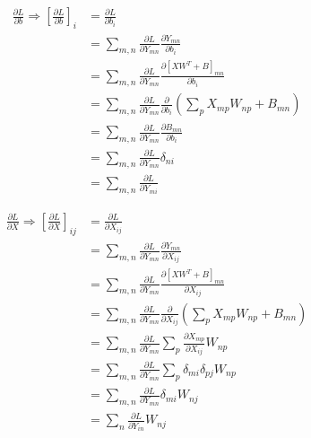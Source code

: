 \documentclass{article}
\begin{document}
\begin{align*}
  \frac{\partial L}{\partial b} \Rightarrow \left[\frac{\partial L}{\partial b}\right]_i &= \frac{\partial L}{\partial b_i} \\
                                                                                         &= \sum_{m,n}\frac{\partial L}{\partial Y_{mn}} \frac{\partial Y_{mn}}{\partial b_i} \\
                                                                                         &= \sum_{m,n}\frac{\partial L}{\partial Y_{mn}} \frac{\partial [XW^T + B]_{mn}}{\partial b_i} \\
                                                                                         &= \sum_{m,n}\frac{\partial L}{\partial Y_{mn}} \frac{\partial}{\partial b_i}\left(\sum_p X_{mp}W_{np} + B_{mn}\right) \\
                                                                                         &= \sum_{m,n}\frac{\partial L}{\partial Y_{mn}} \frac{\partial B_{mn}}{\partial b_i} \\
                                                                                         &= \sum_{m,n}\frac{\partial L}{\partial Y_{mn}} \delta_{ni} \\
&= \sum_{m,n}\frac{\partial L}{\partial Y_{mi}}
\end{align*}


\begin{align*}
  \frac{\partial L}{\partial X} \Rightarrow \left[\frac{\partial L}{\partial X}\right]_{ij} &= \frac{\partial L}{\partial X_{ij}} \\
                                                                                         &= \sum_{m,n}\frac{\partial L}{\partial Y_{mn}} \frac{\partial Y_{mn}}{\partial X_{ij}} \\
                                                                                         &= \sum_{m,n}\frac{\partial L}{\partial Y_{mn}} \frac{\partial [XW^T + B]_{mn}}{\partial X_{ij}} \\
                                                                                            &= \sum_{m,n}\frac{\partial L}{\partial Y_{mn}} \frac{\partial}{\partial X_{ij}}\left(\sum_p X_{mp}W_{np} + B_{mn}\right) \\
                                                                                            &= \sum_{m,n}\frac{\partial L}{\partial Y_{mn}} \sum_p \frac{\partial X_{mp}}{\partial X_{ij}}W_{np} \\
                                                                                            &= \sum_{m,n}\frac{\partial L}{\partial Y_{mn}} \sum_p \delta_{mi}\delta_{pj}W_{np} \\
                                                                                            &= \sum_{m,n}\frac{\partial L}{\partial Y_{mn}} \delta_{mi}W_{nj} \\
  &= \sum_{n}\frac{\partial L}{\partial Y_{in}} W_{nj} \\
\end{align*}
\end{document}

